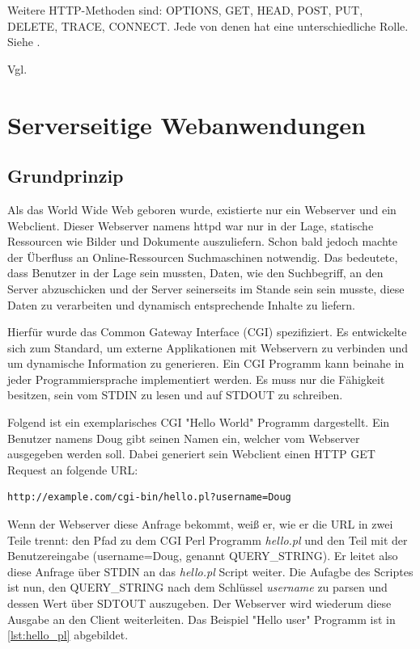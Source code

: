 Weitere HTTP-Methoden sind: OPTIONS, GET, HEAD, POST, PUT, DELETE, TRACE, CONNECT.
Jede von denen hat eine unterschiedliche Rolle. Siehe \cite[Kap. 4]{Fielding:2014}. 

Vgl. \cite{Dubost:2012}

\section{Serverseitige Webanwendungen}

\subsection{Grundprinzip}

Als das World Wide Web geboren wurde, existierte nur ein Webserver und ein Webclient. Dieser Webserver namens httpd war nur in der Lage, statische Ressourcen wie Bilder und Dokumente auszuliefern. Schon bald jedoch machte der Überfluss an Online-Ressourcen Suchmaschinen notwendig. Das bedeutete, dass Benutzer in der Lage sein mussten, Daten, wie den Suchbegriff, an den Server abzuschicken und der Server seinerseits im Stande sein sein musste, diese Daten zu verarbeiten und dynamisch entsprechende Inhalte zu liefern.

Hierfür wurde das Common Gateway Interface (CGI) spezifiziert. Es entwickelte sich zum Standard, um externe Applikationen mit Webservern zu verbinden und um dynamische Information zu generieren. Ein CGI Programm kann beinahe in jeder Programmiersprache implementiert werden. Es muss nur die Fähigkeit besitzen, sein vom STDIN zu lesen und auf STDOUT zu schreiben.

Folgend ist ein exemplarisches CGI "Hello World" Programm dargestellt. Ein Benutzer namens Doug gibt seinen Namen ein, welcher vom Webserver ausgegeben werden soll. Dabei generiert sein Webclient einen HTTP GET Request an folgende URL:

\begin{verbatim}
http://example.com/cgi-bin/hello.pl?username=Doug
\end{verbatim}

Wenn der Webserver diese Anfrage bekommt, weiß er, wie er die URL in zwei Teile trennt: den Pfad zu dem CGI Perl Programm \emph{hello.pl} und den Teil mit der Benutzereingabe (username=Doug, genannt QUERY\_STRING). Er leitet also diese Anfrage über STDIN an das \emph{hello.pl} Script weiter. Die Aufagbe des Scriptes ist nun, den QUERY\_STRING nach dem Schlüssel \emph{username} zu parsen und dessen Wert über SDTOUT auszugeben. Der Webserver wird wiederum diese Ausgabe an den Client weiterleiten. Das Beispiel "Hello user" Programm ist in \ref{lst:hello_pl} abgebildet.

